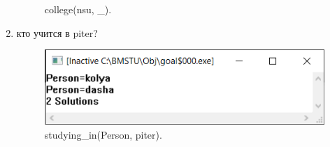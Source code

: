 \begin{enumerate}
\begin{figure}[H]
    \caption{college(nsu, \_).}
\end{figure}
    \item кто учится в piter?
\begin{figure}[H]
    \centering
    \includegraphics[scale=1.5]{data/image/5.png}
    \caption{studying\_in(Person, piter).}
\end{figure}


\end{enumerate}

